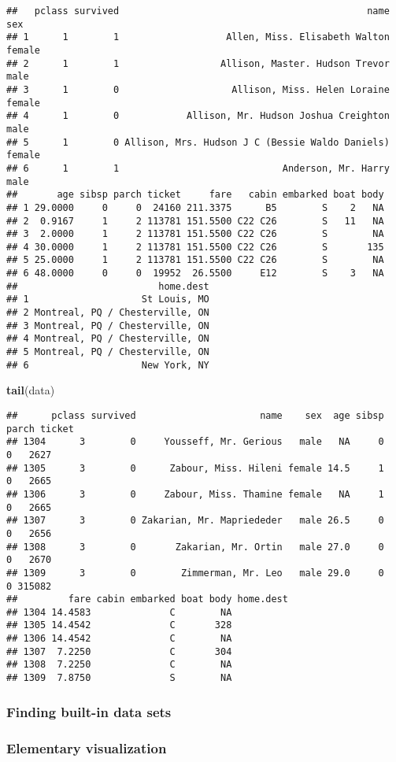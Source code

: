 \documentclass[
]{article}
\newenvironment{Shaded}{\begin{snugshade}}{\end{snugshade}}
\newcommand{\KeywordTok}[1]{\textcolor[rgb]{0.13,0.29,0.53}{\textbf{#1}}}
\newcommand{\NormalTok}[1]{#1}
\begin{document}
\begin{verbatim}
##   pclass survived                                            name    sex
## 1      1        1                   Allen, Miss. Elisabeth Walton female
## 2      1        1                  Allison, Master. Hudson Trevor   male
## 3      1        0                    Allison, Miss. Helen Loraine female
## 4      1        0            Allison, Mr. Hudson Joshua Creighton   male
## 5      1        0 Allison, Mrs. Hudson J C (Bessie Waldo Daniels) female
## 6      1        1                             Anderson, Mr. Harry   male
##       age sibsp parch ticket     fare   cabin embarked boat body
## 1 29.0000     0     0  24160 211.3375      B5        S    2   NA
## 2  0.9167     1     2 113781 151.5500 C22 C26        S   11   NA
## 3  2.0000     1     2 113781 151.5500 C22 C26        S        NA
## 4 30.0000     1     2 113781 151.5500 C22 C26        S       135
## 5 25.0000     1     2 113781 151.5500 C22 C26        S        NA
## 6 48.0000     0     0  19952  26.5500     E12        S    3   NA
##                         home.dest
## 1                    St Louis, MO
## 2 Montreal, PQ / Chesterville, ON
## 3 Montreal, PQ / Chesterville, ON
## 4 Montreal, PQ / Chesterville, ON
## 5 Montreal, PQ / Chesterville, ON
## 6                    New York, NY
\end{verbatim}

\begin{Shaded}
\begin{Highlighting}[]
\KeywordTok{tail}\NormalTok{(data)}
\end{Highlighting}
\end{Shaded}

\begin{verbatim}
##      pclass survived                      name    sex  age sibsp parch ticket
## 1304      3        0     Yousseff, Mr. Gerious   male   NA     0     0   2627
## 1305      3        0      Zabour, Miss. Hileni female 14.5     1     0   2665
## 1306      3        0     Zabour, Miss. Thamine female   NA     1     0   2665
## 1307      3        0 Zakarian, Mr. Mapriededer   male 26.5     0     0   2656
## 1308      3        0       Zakarian, Mr. Ortin   male 27.0     0     0   2670
## 1309      3        0        Zimmerman, Mr. Leo   male 29.0     0     0 315082
##         fare cabin embarked boat body home.dest
## 1304 14.4583              C        NA          
## 1305 14.4542              C       328          
## 1306 14.4542              C        NA          
## 1307  7.2250              C       304          
## 1308  7.2250              C        NA          
## 1309  7.8750              S        NA
\end{verbatim}

\hypertarget{finding-built-in-data-sets}{%
\subsubsection{Finding built-in data
sets}\label{finding-built-in-data-sets}}

\hypertarget{elementary-visualization}{%
\subsubsection{Elementary
visualization}\label{elementary-visualization}}
\end{document}
